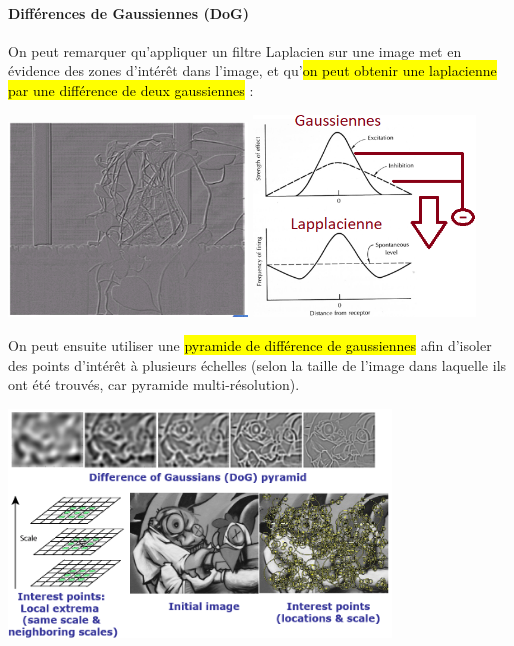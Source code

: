\documentclass[letterpaper, 12pt]{article}
\newcommand{\alinea}{
\hspace*{0.5cm}}
\begin{document}
			\paragraph{Différences de Gaussiennes (DoG)}
				\alinea On peut remarquer qu'appliquer un filtre Laplacien sur une image met en évidence des zones d'intérêt dans l'image, 
					et qu'\hl{on peut obtenir une laplacienne par une différence de deux gaussiennes} : 
				\begin{center}
					\includegraphics[width=2.5in]{Images/laplacian} \hspace*{2cm} \includegraphics[width=2.33in]{Images/gaussian-laplacian} 
				\end{center}
				On peut ensuite utiliser une \hl{pyramide de différence de gaussiennes} afin d'isoler des points d'intérêt à plusieurs
					échelles (selon la taille de l'image dans laquelle ils ont été trouvés, car pyramide multi-résolution).
				\begin{center}
					\includegraphics[width=4in]{Images/dog}
				\end{center}
\end{document}

